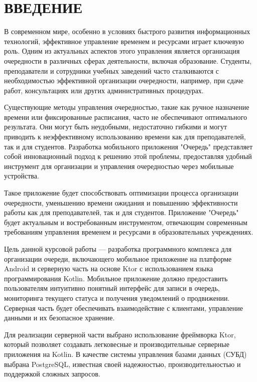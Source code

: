 \chapter*{ВВЕДЕНИЕ}

В современном мире, особенно в условиях быстрого развития информационных
технологий, эффективное управление временем и ресурсами играет ключевую роль.
Одним из актуальных аспектов этого управления является организация очередности
в различных сферах деятельности, включая образование.
Студенты, преподаватели и сотрудники учебных заведений часто сталкиваются
с необходимостью эффективной организации очередности, например,
при сдаче работ, консультациях или других административных процедурах.\par
Существующие методы управления очередностью,
такие как ручное назначение времени или фиксированные расписания,
часто не обеспечивают оптимального результата. Они могут быть неудобными,
недостаточно гибкими и могут приводить к неэффективному использованию времени
как для преподавателей, так и для студентов.
Разработка мобильного приложения "Очередь"
представляет собой инновационный подход к решению этой проблемы,
предоставляя удобный инструмент для организации
и управления очередностью через мобильные устройства.\par
Такое приложение будет способствовать оптимизации процесса
организации очередности, уменьшению времени ожидания
и повышению эффективности работы как для преподавателей,
так и для студентов. Приложение "Очередь" будет актуальным
и востребованным инструментом, отвечающим современным требованиям управления
временем и ресурсами в образовательных учреждениях.\par
Цель данной курсовой работы --- разработка программного комплекса
для организации очереди, включающего мобильное приложение
на платформе Android и серверную часть
на основе Ktor с использованием языка программирования Kotlin.
Мобильное приложение должно предоставить пользователям интуитивно понятный
интерфейс для записи в очередь, мониторинга текущего статуса
и получения уведомлений о продвижении. Серверная часть будет обеспечивать
взаимодействие с клиентами, управление данными и их безопасное хранение.\par
Для реализации серверной части выбрано использование фреймворка Ktor,
который позволяет создавать легковесные и производительные серверные
приложения на Kotlin. В качестве системы управления базами данных (СУБД)
выбрана PostgreSQL, известная своей надежностью,
производительностью и поддержкой сложных запросов.\par
